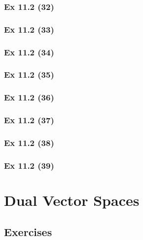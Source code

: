 \subsubsection{Ex 11.2 (32)}\label{sec:Ex_11.2.32}

\subsubsection{Ex 11.2 (33)}\label{sec:Ex_11.2.33}

\subsubsection{Ex 11.2 (34)}\label{sec:Ex_11.2.34}

\subsubsection{Ex 11.2 (35)}\label{sec:Ex_11.2.35}

\subsubsection{Ex 11.2 (36)}\label{sec:Ex_11.2.36}

\subsubsection{Ex 11.2 (37)}\label{sec:Ex_11.2.37}

\subsubsection{Ex 11.2 (38)}\label{sec:Ex_11.2.38}

\subsubsection{Ex 11.2 (39)}\label{sec:Ex_11.2.39}

\newpage		%

\section{Dual Vector Spaces}\label{sec:11.3}	
\subsection*{Exercises}\label{sec:11.3_Exercises}


